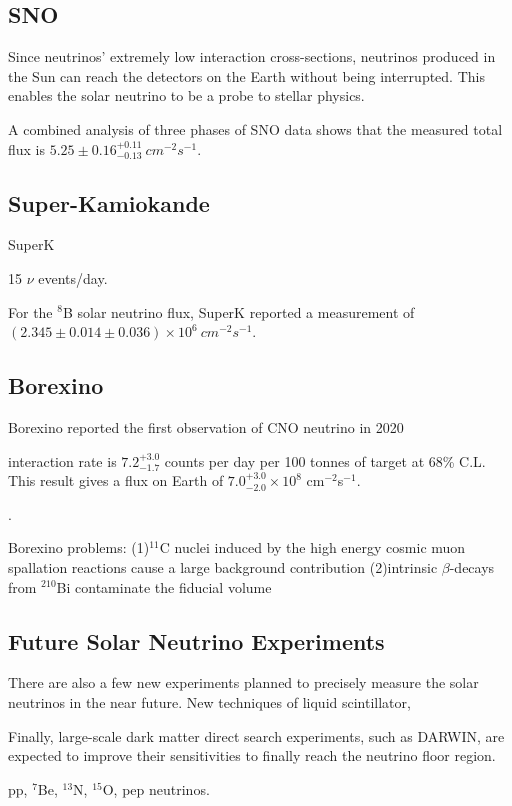 \subsection{SNO}

Since neutrinos' extremely low interaction cross-sections, neutrinos produced in the Sun can reach the detectors on the Earth without being interrupted. This enables the solar neutrino to be a probe to stellar physics.

A combined analysis of three phases of SNO data shows that the measured total flux is $5.25\pm0.16^{+0.11}_{-0.13}~cm^{-2}s^{-1}$.

\subsection{Super-Kamiokande}
SuperK

15 $\nu$ events/day.

For the $^8$B solar neutrino flux, SuperK reported a measurement of $(2.345\pm0.014\pm0.036)\times 10^6~cm^{-2}s^{-1}$.

\subsection{Borexino}

Borexino reported the first observation of CNO neutrino in 2020

interaction rate is $7.2^{+3.0}_{-1.7}$ counts per day per 100 tonnes of target at 68\% C.L. This result gives a flux on Earth of $7.0^{+3.0}_{-2.0}\times 10^8$ cm$^{-2}$s$^{-1}$.

\cite{borexino2020experimental}.

Borexino problems:
(1)$^{11}$C nuclei induced by the high energy cosmic muon spallation reactions 
cause a large background contribution
(2)intrinsic $\beta$-decays from $^{210}$Bi contaminate the fiducial volume 


\subsection{Future Solar Neutrino Experiments}
There are also a few new experiments planned to precisely measure the solar neutrinos in the near future. 
New techniques of liquid scintillator, 

Finally, large-scale dark matter direct search experiments, such as DARWIN, are expected to improve their sensitivities to finally reach the neutrino floor region.

pp, $^7$Be, $^{13}$N, $^{15}$O, pep neutrinos\cite{baudis2014neutrino,aalbers2020solar}.

